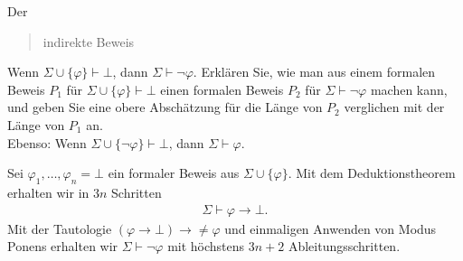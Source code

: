 
\begin{exercise}[98]

Der \blockquote{indirekte Beweis}: Wenn $\Sigma \cup \{\varphi\} \vdash \bot$, dann
$\Sigma \vdash \neg \varphi$. Erklären Sie, wie man aus einem formalen Beweis
$P_1$ für $\Sigma \cup \{\varphi\} \vdash \bot$ einen formalen Beweis $P_2$
für $\Sigma \vdash \neg \varphi$ machen kann, und geben Sie eine obere
Abschätzung für die Länge von $P_2$ verglichen mit der Länge von $P_1$ an. \\
Ebenso: Wenn $\Sigma \cup \{\neg \varphi\} \vdash \bot$, dann $\Sigma \vdash \varphi$.

\end{exercise}


\begin{solution}

Sei $\varphi_1,\dots,\varphi_n = \bot$ ein formaler Beweis aus $\Sigma \cup \{\varphi\}$.
Mit dem Deduktionstheorem erhalten wir in $3n$ Schritten
\begin{align*}
  \Sigma \vdash \varphi \rightarrow \bot.
\end{align*}
Mit der Tautologie $(\varphi \rightarrow \bot) \rightarrow \neq \varphi$
und einmaligen Anwenden von Modus Ponens erhalten wir $\Sigma \vdash \neg \varphi$
mit höchstens $3n + 2$ Ableitungsschritten.

\end{solution}

